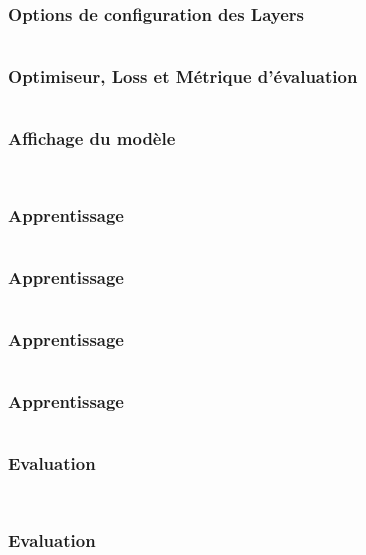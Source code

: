 \documentclass{formation}
\begin{document}
\begin{frame}
  \frametitle{Options de configuration des Layers}
  \inputminted[linenos,fontsize=\small,bgcolor=pythonbg]{python}{code-illustration/tf-keras-configurelayer.py}
\end{frame}

\begin{frame}
  \frametitle{Optimiseur, Loss et Métrique d'évaluation}
  \inputminted[linenos,fontsize=\small,bgcolor=pythonbg]{python}{code-illustration/tf-keras-compile.py}
\end{frame}

\begin{frame}
  \frametitle{Affichage du modèle}
  \inputminted[linenos,fontsize=\small,bgcolor=pythonbg]{python}{code-illustration/tf-keras-print-model.py}
  \inputminted[linenos,fontsize=\small,bgcolor=returnbg]{python}{code-illustration/tf-keras-print-model.txt}
\end{frame}

\begin{frame}
  \frametitle{Apprentissage}
  \inputminted[linenos,fontsize=\small,bgcolor=pythonbg]{python}{code-illustration/tf-keras-learn-1.py}
\end{frame}

\begin{frame}
  \frametitle{Apprentissage}
  \inputminted[linenos,fontsize=\small,bgcolor=pythonbg]{python}{code-illustration/tf-keras-learn-2.py}
\end{frame}

\begin{frame}
  \frametitle{Apprentissage}
  \inputminted[linenos,fontsize=\small,bgcolor=pythonbg]{python}{code-illustration/tf-keras-learn-3.py}
\end{frame}

\begin{frame}
  \frametitle{Apprentissage}
  \inputminted[linenos,fontsize=\small,bgcolor=pythonbg]{python}{code-illustration/tf-keras-learn-4.py}
\end{frame}

\begin{frame}
  \frametitle{Evaluation}
  \inputminted[linenos,fontsize=\small,bgcolor=pythonbg]{python}{code-illustration/tf-keras-evaluate.py}
  \inputminted[linenos,fontsize=\small,bgcolor=returnbg]{text}{code-illustration/tf-keras-evaluate.txt}
\end{frame}

\begin{frame}
  \frametitle{Evaluation}
  \inputminted[linenos,fontsize=\small,bgcolor=pythonbg]{python}{code-illustration/tf-keras-predict.py}
  \inputminted[linenos,fontsize=\small,bgcolor=returnbg]{text}{code-illustration/tf-keras-predict.txt}
\end{frame}
\end{document}
